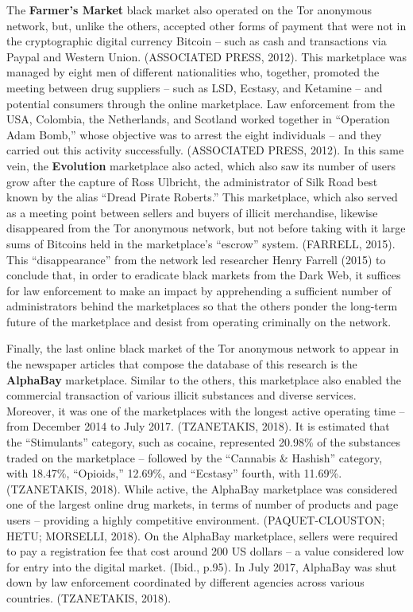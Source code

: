 The \textbf{Farmer's Market} black market also operated on the Tor anonymous network, but, unlike the others, accepted other forms of payment that were not in the cryptographic digital currency Bitcoin -- such as cash and transactions via Paypal and Western Union. (ASSOCIATED PRESS, 2012). This marketplace was managed by eight men of different nationalities who, together, promoted the meeting between drug suppliers -- such as LSD, Ecstasy, and Ketamine -- and potential consumers through the online marketplace. Law enforcement from the USA, Colombia, the Netherlands, and Scotland worked together in ``Operation Adam Bomb,'' whose objective was to arrest the eight individuals -- and they carried out this activity successfully. (ASSOCIATED PRESS, 2012). In this same vein, the \textbf{Evolution} marketplace also acted, which also saw its number of users grow after the capture of Ross Ulbricht, the administrator of Silk Road best known by the alias ``Dread Pirate Roberts.'' This marketplace, which also served as a meeting point between sellers and buyers of illicit merchandise, likewise disappeared from the Tor anonymous network, but not before taking with it large sums of Bitcoins held in the marketplace's ``escrow'' system. (FARRELL, 2015). This ``disappearance'' from the network led researcher Henry Farrell (2015) to conclude that, in order to eradicate black markets from the Dark Web, it suffices for law enforcement to make an impact by apprehending a sufficient number of administrators behind the marketplaces so that the others ponder the long-term future of the marketplace and desist from operating criminally on the network.

Finally, the last online black market of the Tor anonymous network to appear in the newspaper articles that compose the database of this research is the \textbf{AlphaBay} marketplace. Similar to the others, this marketplace also enabled the commercial transaction of various illicit substances and diverse services. Moreover, it was one of the marketplaces with the longest active operating time -- from December 2014 to July 2017. (TZANETAKIS, 2018). It is estimated that the ``Stimulants'' category, such as cocaine, represented 20.98\% of the substances traded on the marketplace -- followed by the ``Cannabis \& Hashish'' category, with 18.47\%, ``Opioids,'' 12.69\%, and ``Ecstasy'' fourth, with 11.69\%. (TZANETAKIS, 2018). While active, the AlphaBay marketplace was considered one of the largest online drug markets, in terms of number of products and page users -- providing a highly competitive environment. (PAQUET-CLOUSTON; HETU; MORSELLI, 2018). On the AlphaBay marketplace, sellers were required to pay a registration fee that cost around 200 US dollars -- a value considered low for entry into the digital market. (Ibid., p.95). In July 2017, AlphaBay was shut down by law enforcement coordinated by different agencies across various countries. (TZANETAKIS, 2018).

